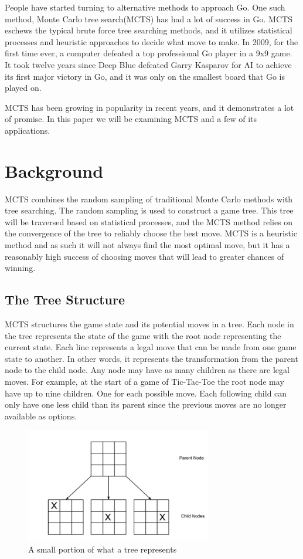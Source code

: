 \documentclass{sig-alternate}
\begin{document}
People have started turning to alternative methods to approach Go. One such method, Monte Carlo tree search(MCTS) has had a lot of success in Go. MCTS eschews the typical brute force tree searching methods, and it utilizes statistical processes and heuristic approaches to decide what move to make. In 2009, for the first time ever, a computer defeated a top professional Go player in a 9x9 game\cite{TheGrandChallenge}. It took twelve years since Deep Blue defeated Garry Kasparov for AI to achieve its first major victory in Go, and it was only on the smallest board that Go is played on.

MCTS has been growing in popularity in recent years, and it demonstrates a lot of promise. In this paper we will be examining MCTS and a few of its applications.  
\section{Background}
MCTS combines the random sampling of traditional Monte Carlo methods with tree searching. The random sampling is used to construct a game tree. This tree will be traversed based on statistical processes, and the MCTS method relies on the convergence of the tree to reliably choose the best move. MCTS is a heuristic method and as such it will not always find the most optimal move, but it has a reasonably high success of choosing moves that will lead to greater chances of winning.
\subsection{The Tree Structure}
MCTS structures the game state and its potential moves in a tree. Each node in the tree represents the state of the game with the root node representing the current state. Each line represents a legal move that can be made from one game state to another. In other words, it represents the transformation from the parent node to the child node. Any node may have as many children as there are legal moves. For example, at the start of a game of Tic-Tac-Toe the root node may have up to nine children. One for each possible move. Each following child can only have one less child than its parent since the previous moves are no longer available as options.
\begin{figure}[h]
\includegraphics[height=5cm]{TicTacToeTree.jpg}
\centering
\caption{A small portion of what a tree represents}
\label{fig:TicTacToe}
\end{figure}
\end{document}
